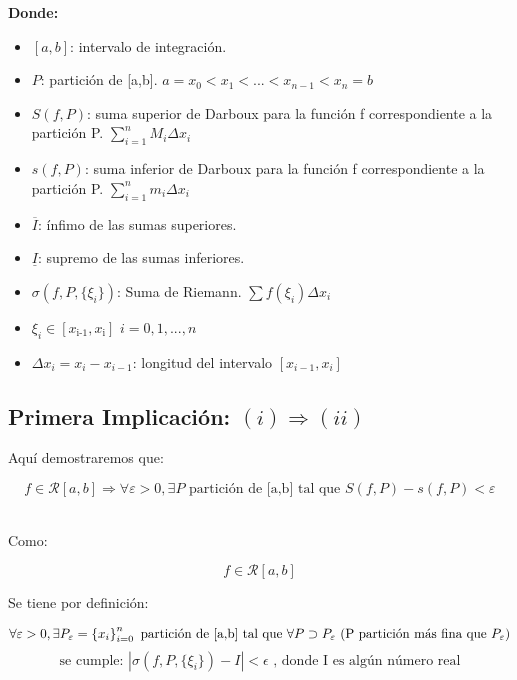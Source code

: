 \documentclass[a4paper,12pt]{article}
\begin{document}
	
	\textbf{Donde:}
	\begin{itemize}
		\item \( [a,b] \): intervalo de integración.
		\item \( P \): partición de [a,b]. $ a = x_0 < x_1 < ... < x_{n-1} < x_n = b $
		\item \( S(f,P) \): suma superior de Darboux para la función f correspondiente a la partición P. $ \sum_{i=1}^{n} M_i \Delta x_i $
		\item \( s(f,P) \): suma inferior de Darboux para la función f correspondiente a la partición P. $ \sum_{i=1}^{n} m_i \Delta x_i $
		\item \( \overline{I} \): ínfimo de las sumas superiores.
		\item \( \underline{I} \): supremo de las sumas inferiores.
		\item \( \sigma(f, P, \{\xi_i\}) \): Suma de Riemann. $ \sum f(\xi_i) \Delta x_i $ 
		\item \( \xi_i \in [x_{\text{i-1}},x_{\text{i}}] \) $ i = 0,1,...,n $ 
		\item \( \Delta x_i = x_i - x_{i-1} \): longitud del intervalo $[x_{i-1}, x_i ]$
		
		
	\end{itemize}
	\subsection{Primera Implicación: $ (i) \Rightarrow (ii) $ }


	Aquí demostraremos que:
	
	
	
	\[
	f \in \mathcal{R}[a,b] \Rightarrow \forall \varepsilon > 0, \exists P \text{ partición de [a,b] tal que  }   S(f,P) - s(f,P) < \varepsilon 
	\]
	
	\quad \\
	
	Como:
	
	\[
	f \in \mathcal{R}[a,b] 
	\]
	
	Se tiene por definición:
	
	\[
	\forall \varepsilon > 0, \exists P_\varepsilon = \left\{ x_i \right\}_{i=0}^{n}  \text{ partición de [a,b] tal que  } \forall P \supset P_\varepsilon \text{ (P partición más fina que $ P_\varepsilon $)} 
	\]
	\[
	 \text{se cumple: } \left| \sigma(f, P, \{\xi_i\}) - I \right| < \epsilon \text{ , donde I es algún número real}
	\]
	
	\quad \\
	
\end{document}
